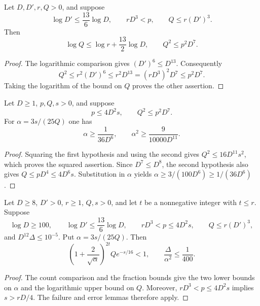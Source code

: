 \begin{lemma}
    \label{lem:nested_sampling_count_comparison}
    \leanok
    Let $D,D',r,Q>0$, and suppose
    \[
        \log D'\le\frac{13}{6}\log D,\qquad
        rD^3<p,\qquad Q\le r(D')^3.
    \]
    Then
    \[
        \log Q\le\log r+\frac{13}{2}\log D,
        \qquad Q^2\le p^2D^7.
    \]
\end{lemma}
\begin{proof}\leanok
    The logarithmic comparison gives $(D')^6\le D^{13}$.
    Consequently
    \[
        Q^2\le r^2(D')^6\le r^2D^{13}
        =(rD^3)^2D^7\le p^2D^7.
    \]
    Taking the logarithm of the bound on $Q$ proves the other assertion.
\end{proof}

\begin{lemma}
    \label{lem:nested_sampling_fraction_bounds}
    \leanok
    Let $D\ge1$, $p,Q,s>0$, and suppose
    \[
        p\le4D^2s,\qquad Q^2\le p^2D^7.
    \]
    For $\alpha=3s/(25Q)$ one has
    \[
        \alpha\ge\frac{1}{36D^6},\qquad
        \alpha^2\ge\frac{9}{10000D^{11}}.
    \]
\end{lemma}
\begin{proof}\leanok
    Squaring the first hypothesis and using the second gives
    $Q^2\le16D^{11}s^2$, which proves the squared assertion.
    Since $D^7\le D^8$, the second hypothesis also gives
    $Q\le pD^4\le4D^6s$. Substitution in $\alpha$ yields
    $\alpha\ge3/(100D^6)\ge1/(36D^6)$.
\end{proof}

\begin{lemma}
    \label{lem:nested_sampling_conditions}
    \leanok
    Let $D\ge8$, $D'>0$, $r\ge1$, $Q,s>0$, and let $t$ be a nonnegative
    integer with $t\le r$. Suppose
    \[
        \log D\ge100,\qquad
        \log D'\le\frac{13}{6}\log D,\qquad
        rD^3<p\le4D^2s,\qquad Q\le r(D')^3,
    \]
    and $D^{12}\Delta\le10^{-5}$.
    Put $\alpha=3s/(25Q)$. Then
    \[
        \left(1+\frac{2}{\sqrt\alpha}\right)^{2t}
        Qe^{-s/16}<1,\qquad
        \frac{\Delta}{\alpha^2}\le\frac1{400}.
    \]
\end{lemma}
\begin{proof}\leanok
    The count comparison and the fraction bounds give the two lower bounds
    on $\alpha$ and the logarithmic upper bound on $Q$.
    Moreover, $rD^3<p\le4D^2s$ implies $s>rD/4$.
    The failure and error lemmas therefore apply.
\end{proof}

